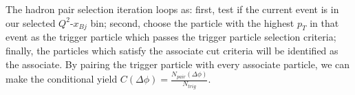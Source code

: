 The hadron pair selection iteration loops as: first, test if the current event is in
our selected $Q^{2}$-$x_{Bj}$ bin; second, choose the particle with the highest
$p_{T}$ in that event as the trigger particle which passes the trigger particle selection criteria;
finally, the particles which satisfy the associate cut criteria will be identified
as the associate. By pairing the trigger particle with every associate particle, we can
make the conditional yield $C(\Delta\phi)=\frac{N_{pair}(\Delta\phi)}{N_{trig}}$.

%


